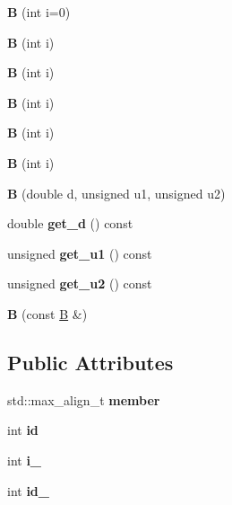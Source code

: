 \begin{DoxyCompactItemize}
\item 
\mbox{\label{struct_b_aaad4c6e84b48e8927c5be62550d2b45d}} 
{\bfseries B} (int i=0)
\item 
\mbox{\label{struct_b_a631af3c8626a2694558d43dbd9170f7e}} 
{\bfseries B} (int i)
\item 
\mbox{\label{struct_b_a631af3c8626a2694558d43dbd9170f7e}} 
{\bfseries B} (int i)
\item 
\mbox{\label{struct_b_a631af3c8626a2694558d43dbd9170f7e}} 
{\bfseries B} (int i)
\item 
\mbox{\label{struct_b_a631af3c8626a2694558d43dbd9170f7e}} 
{\bfseries B} (int i)
\item 
\mbox{\label{struct_b_a631af3c8626a2694558d43dbd9170f7e}} 
{\bfseries B} (int i)
\item 
\mbox{\label{struct_b_a0b7de89308ed8528ba8d17a5da7678ce}} 
{\bfseries B} (double d, unsigned u1, unsigned u2)
\item 
\mbox{\label{struct_b_af92ba8104da314bb551215be2270d4fd}} 
double {\bfseries get\+\_\+d} () const
\item 
\mbox{\label{struct_b_a5914b3d30e42392643cb0eef7bc2a871}} 
unsigned {\bfseries get\+\_\+u1} () const
\item 
\mbox{\label{struct_b_a6c068ae49439436980c47b82d898d5bd}} 
unsigned {\bfseries get\+\_\+u2} () const
\item 
\mbox{\label{struct_b_ae166a863181a104c142ebd852b038cab}} 
{\bfseries B} (const \mbox{\hyperlink{struct_b}{B}} \&)
\end{DoxyCompactItemize}
\subsection*{Public Attributes}
\begin{DoxyCompactItemize}
\item 
\mbox{\label{struct_b_a4d8928829c5884b9093b6d36e1a5c734}} 
std\+::max\+\_\+align\+\_\+t {\bfseries member}
\item 
\mbox{\label{struct_b_a3929f009040932231d121f113e1972dc}} 
int {\bfseries id}
\item 
\mbox{\label{struct_b_ae729fb299b47cc6183e0a97684c1bcc1}} 
int {\bfseries i\+\_\+}
\item 
\mbox{\label{struct_b_a0ddf207e9a4e7c97a0ed4a453b6bc5e9}} 
int {\bfseries id\+\_\+}
\end{DoxyCompactItemize}
